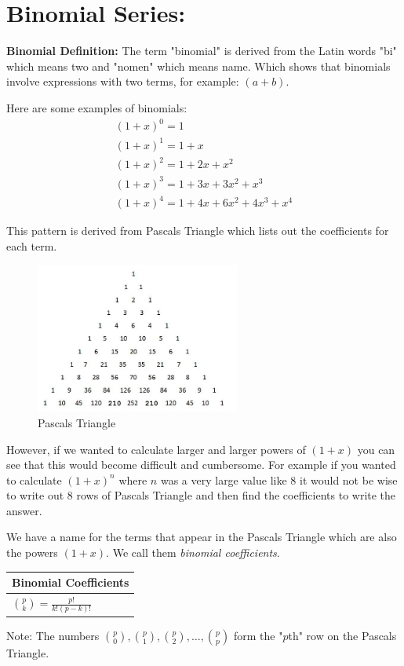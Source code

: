 \documentclass[12pt]{article}
\newcommand{\formula}[2]{
    {\renewcommand{\arraystretch}{2}
        \begin{center}
        \begin{tabular}{|p{0.9\textwidth}|}
        \hline
        \textbf{#1} \\
        \hline
        #2 \\
        \hline
        \end{tabular}
        \end{center}
    }
}
\begin{document}
\newpage

\section{Binomial Series: }
\textbf{Binomial Definition:}
The term "binomial" is derived from the Latin words "bi" which means two and "nomen" which means name. Which shows that binomials involve expressions with two terms, for example: $(a+b)$.

Here are some examples of binomials:
\begin{gather*}
(1+x)^0 = 1 \\
(1+x)^1 = 1+x \\
(1+x)^2 = 1 + 2x + x^2 \\
(1+x)^3 = 1 + 3x + 3x^2 + x^3 \\
(1+x)^4 = 1 + 4x + 6x^2 + 4x^3 + x^4
\end{gather*}

This pattern is derived from Pascals Triangle which lists out the coefficients for each term.

\begin{figure}[h]
\centering
\includegraphics[width=0.6\textwidth]{img/pascals_triangle}
\caption{Pascals Triangle}
\end{figure}

\newpage

However, if we wanted to calculate larger and larger powers of $(1+x)$ you can see that this would become difficult and cumbersome. For example if you wanted to calculate $(1+x)^n$ where $n$ was a very large value like $8$ it would not be wise to write out $8$ rows of Pascals Triangle and then find the coefficients to write the answer.

We have a name for the terms that appear in the Pascals Triangle which are also the powers $(1+x)$. We call them \textit{binomial coefficients}.

\formula{Binomial Coefficients}{$\binom{p}{k} = \frac{p!}{k!(p-k)!}$}
Note: The numbers $\binom{p}{0}, \binom{p}{1}, \binom{p}{2}, \dotsc, \binom{p}{p}$ form the "$p$th" row on the Pascals Triangle.
\end{document}
